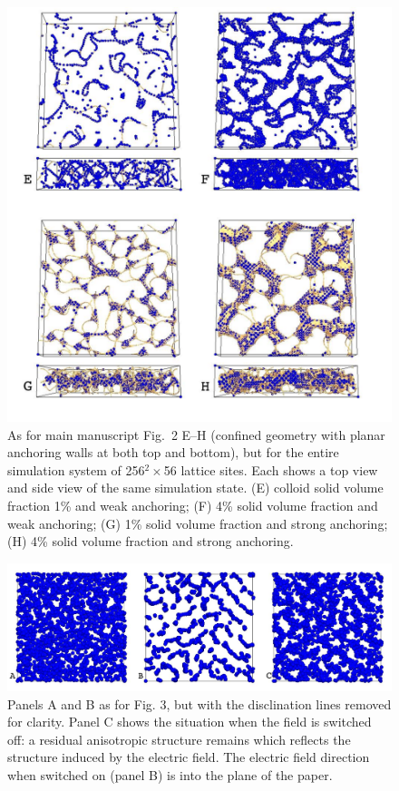 \documentclass[12pt,twoside]{article}
\begin{document}
\begin{figure}[!h]
\begin{center}
\includegraphics[scale=0.42]{support-fig6.pdf}
\end{center}
\caption{As for main manuscript Fig.~2 E--H (confined geometry with planar
anchoring walls at both top and bottom), but for the entire simulation
system of 256$^2\times$56 lattice sites. Each shows a top view and
side view of the same simulation state. (E) colloid solid volume fraction 1\%
and weak anchoring; (F) 4\% solid volume fraction and weak anchoring;
(G) 1\% solid volume fraction and strong anchoring; (H) 4\% solid
volume fraction and strong anchoring.}
\end{figure}

\newpage


\begin{figure}[!h]
\begin{center}
\includegraphics[width=0.95\columnwidth]{support-fig7.pdf}
\end{center}
\caption{Panels A and B as for Fig. 3, but with the disclination lines
removed for clarity. Panel C shows the situation when the field is
switched off: a residual anisotropic structure remains which reflects the
structure induced by the electric field. The electric field direction
when switched on (panel B) is into the plane of the paper.}
\end{figure}
\end{document}
